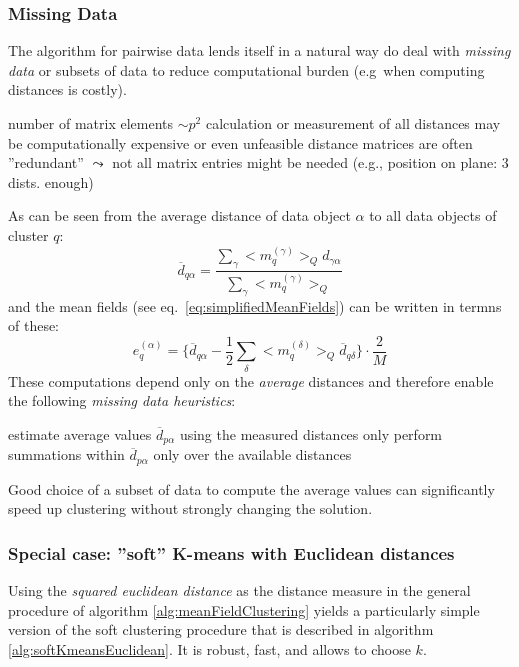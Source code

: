 
\subsubsection{Missing Data}
The algorithm for pairwise data lends itself in a natural way do deal with \emph{missing data} or subsets of data to reduce computational burden (e.g\ when computing distances is costly). 
\begin{itemize}
	\itl number of matrix elements $\sim p^2$ 
	\itl calculation or measurement of all distances may be computationally
		expensive or even unfeasible
	\itl distance matrices are often ''redundant'' $\leadsto$ not all
		matrix entries might be needed (e.g., position on plane: 3 dists. enough)
\end{itemize}
As can be seen from the average distance of data object $\alpha$ to
all data objects of cluster $q$:
\begin{equation}
	\overline{d}_{q \alpha} 
	= \frac{\sum\limits_{\gamma} \big< m_q^{(\gamma)} \big>_Q 
		d_{\gamma \alpha} }{ \sum\limits_{\gamma} \big<
		m_q^{(\gamma)} \big>_Q}
\end{equation}
and the mean fields (see eq.~\ref{eq:simplifiedMeanFields}) can be written in termns of these:
\begin{equation}
	e_q^{(\alpha)} 
	= \bigg\{ \overline{d}_{q \alpha} - \frac{1}{2} \sum\limits_{\delta}
		\big< m_q^{(\delta)} \big>_Q \overline{d}_{q \delta} \bigg\}
		\cdot \frac{2}{M}
\end{equation}
These computations depend only on the \emph{average} distances and therefore enable the following \emph{missing data heuristics}:
\begin{itemize}
	\itR estimate average values $\overline{d}_{p \alpha}$ using the 
		measured distances only
	\itR perform summations within $\overline{d}_{p \alpha}$ only over the
		available distances
\end{itemize}
Good choice of a subset of data to compute the average values can
significantly speed up clustering without strongly changing the solution.




\subsubsection[Euclidean soft k-means clustering]{Special case: ''soft'' K-means with Euclidean distances}
Using the \emph{squared euclidean distance} as the distance measure in
the general procedure of algorithm \ref{alg:meanFieldClustering}
yields a particularly simple version of the soft clustering procedure
that is described in algorithm \ref{alg:softKmeansEuclidean}. It is robust, fast, and allows to choose $k$. 

